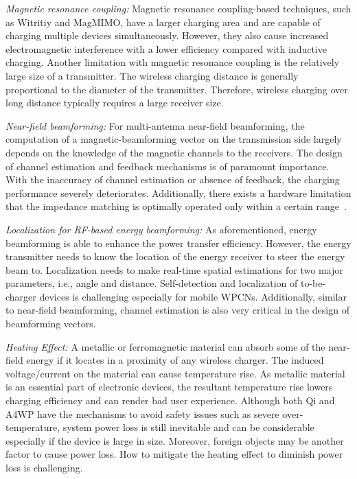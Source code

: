 \documentclass[twocolumn,10pt]{IEEEtran}
\begin{document}
{\em Magnetic resonance coupling:} Magnetic resonance coupling-based techniques, such as Witritiy and MagMIMO, have a larger charging area and are capable of charging multiple devices simultaneously. However, they also cause increased electromagnetic interference with a lower efficiency compared with inductive charging. Another limitation with magnetic resonance coupling is the relatively large size of a transmitter. The wireless charging distance is generally proportional to the diameter of the transmitter. Therefore, wireless charging over long distance typically requires a large receiver size.


{\em Near-field beamforming:} For multi-antenna near-field beamforming, the computation of a magnetic-beamforming vector on the transmission side largely depends on the knowledge of the magnetic channels to the receivers. The design of channel estimation and feedback mechanisms is of paramount importance. With the inaccuracy of channel estimation or absence of feedback, the charging performance severely deteriorates. Additionally, there exists a hardware limitation that the impedance matching is optimally operated only within a certain range~\cite{J.2014Jadidian}.

 
{\em Localization for RF-based energy beamforming:}
As aforementioned, energy beamforming is able to enhance the power transfer efficiency. However, the energy transmitter needs to know the location of the energy receiver to steer the energy beam to. Localization needs to make real-time spatial estimations for two major parameters, i.e., angle and distance. Self-detection and localization of to-be-charger devices is challenging especially for mobile WPCNs. Additionally, similar to near-field beamforming, channel estimation is also very critical in the design of beamforming vectors. 



{\em Heating Effect:} A metallic or ferromagnetic material can absorb some of the near-field energy if it locates in a proximity of any wireless charger. The induced voltage/current on the material can 
cause temperature rise. As metallic material is an essential part of electronic devices, the resultant
temperature rise lowers charging efficiency and can render bad user experience. Although both Qi and A4WP have the mechanisms to avoid safety issues such as severe over-temperature, system power
loss is still inevitable and can be considerable especially if the device is large in size. Moreover, foreign objects may be another factor to cause power loss. How to mitigate the heating effect to diminish power loss is challenging.
\end{document}
